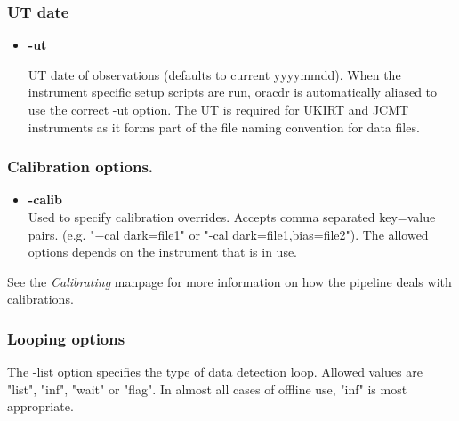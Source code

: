 \documentclass[twoside,11pt]{article}
\renewcommand{\_}{\texttt{\symbol{95}}}
\begin{document}
\subsubsection*{UT date}%

\begin{itemize}

\item{\bf -ut}%
%

UT date of observations (defaults to current yyyymmdd). When the
instrument specific setup scripts are run, oracdr is automatically
aliased to use the correct -ut option. The UT is required for
UKIRT and JCMT instruments as it forms part of the file naming
convention for data files.

\end{itemize}

\subsubsection*{Calibration options.}%

\begin{itemize}

\item{\bf -calib}%
%
\hfil\\
Used to specify calibration overrides. Accepts comma separated key=value
pairs. (e.g. "$-$cal dark=file1" or "-cal dark=file1,bias=file2"). The
allowed options depends on the instrument that is in use.

\end{itemize}

See the {\em Calibrating\/} manpage for more information on how the pipeline deals
with calibrations.

\subsubsection*{Looping options}%

The -list option specifies the type of data detection loop. Allowed
values are "list", "inf", "wait" or "flag". In almost all cases of
offline use, "inf" is most appropriate.
\end{document}
